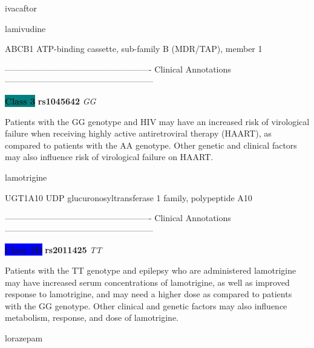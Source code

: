 \documentclass{resume} %
\begin{document}
\begin{rSection}{ ivacaftor }
\end{rSection}\begin{rSection}{ lamivudine }
\item[]

\begin{rSubsection}{ ABCB1 }{ ATP-binding cassette, sub-family B (MDR/TAP), member 1 }{}{}
\item[]

\item[] ---------------------------------------------------- Clinical Annotations -----------------------------------------------------\newline
\item \textbf{\colorbox{teal} {Class 3}} \textbf{ rs1045642 } \textit{ GG }
\item[] Patients with the GG genotype and HIV may have an increased risk of virological failure when receiving highly active antiretroviral therapy (HAART), as compared to patients with the AA genotype. Other genetic and clinical factors may also influence risk of virological failure on HAART.
\end{rSubsection}

\end{rSection}\begin{rSection}{ lamotrigine }
\item[]

\begin{rSubsection}{ UGT1A10 }{ UDP glucuronosyltransferase 1 family, polypeptide A10 }{}{}
\item[]

\item[] ---------------------------------------------------- Clinical Annotations -----------------------------------------------------\newline
\item \textbf{\colorbox{blue} {Class 2B}} \textbf{ rs2011425 } \textit{ TT }
\item[] Patients with the TT genotype and epilepsy who are administered lamotrigine may have increased serum concentrations of lamotrigine, as well as improved response to lamotrigine, and may need a higher dose as compared to patients with the GG genotype. Other clinical and genetic factors may also influence metabolism, response, and dose of lamotrigine.  
\end{rSubsection}

\end{rSection}\begin{rSection}{ lorazepam }
\item[]


\end{rSection}
\end{document}
